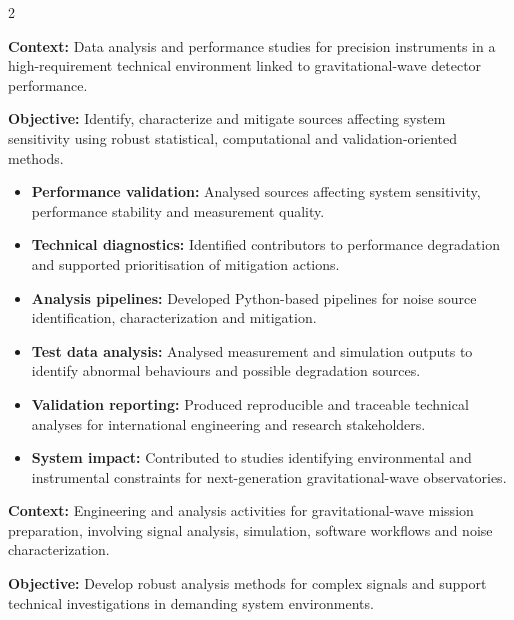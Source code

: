 \documentclass[8pt,a4paper,ragged2e,withhyper]{altacv}
\begin{document}
\begin{paracol}{2}
\divider


\textbf{Context:} Data analysis and performance studies for precision instruments in a high-requirement technical environment linked to gravitational-wave detector performance.

\textbf{Objective:} Identify, characterize and mitigate sources affecting system sensitivity using robust statistical, computational and validation-oriented methods.

\begin{itemize}
  \item \textbf{Performance validation:} Analysed sources affecting system sensitivity, performance stability and measurement quality.
  \item \textbf{Technical diagnostics:} Identified contributors to performance degradation and supported prioritisation of mitigation actions.
  \item \textbf{Analysis pipelines:} Developed Python-based pipelines for noise source identification, characterization and mitigation.
  \item \textbf{Test data analysis:} Analysed measurement and simulation outputs to identify abnormal behaviours and possible degradation sources.
  \item \textbf{Validation reporting:} Produced reproducible and traceable technical analyses for international engineering and research stakeholders.
  \item \textbf{System impact:} Contributed to studies identifying environmental and instrumental constraints for next-generation gravitational-wave observatories.
\end{itemize}

\divider


\textbf{Context:} Engineering and analysis activities for gravitational-wave mission preparation, involving signal analysis, simulation, software workflows and noise characterization.

\textbf{Objective:} Develop robust analysis methods for complex signals and support technical investigations in demanding system environments.


\end{paracol}
\end{document}
